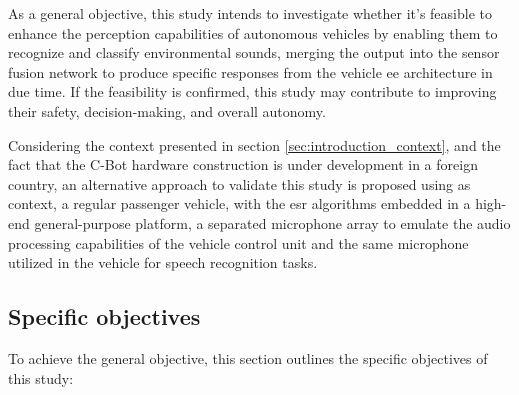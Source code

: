 As a general objective, this study intends to investigate whether it's feasible to enhance the perception capabilities of autonomous vehicles by enabling them to recognize and classify environmental sounds, merging the output into the sensor fusion network to produce specific responses from the vehicle \gls{ee} architecture in due time. If the feasibility is confirmed, this study may contribute to improving their safety, decision-making, and overall autonomy. 

Considering the context presented in section \ref{sec:introduction_context}, and the fact that the C-Bot hardware construction is under development in a foreign country, an alternative approach to validate this study is proposed using as context, a regular passenger vehicle, with the \gls{esr} algorithms embedded in a high-end general-purpose platform, a separated microphone array to emulate the audio processing capabilities of the vehicle control unit and the same microphone utilized in the vehicle for speech recognition tasks.

\subsection{Specific objectives}
\label{subsec:objectives_specifics}

To achieve the general objective, this section outlines the specific objectives of this study:

